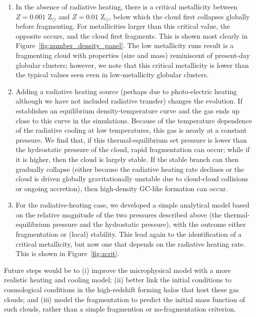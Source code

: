 \documentclass[useAMS,usenatbib]{mn2e}
\begin{document}
\begin{enumerate}

\item In the absence of radiative heating, there is a critical metallicity between $Z=0.001$ Z$_\odot$ and $Z=0.01$ Z$_\odot$, below which the cloud first collapses globally before fragmenting.  For metallicities larger than this critical value, the opposite occurs, and the cloud first fragments.  This is shown most clearly in Figure~\ref{fig:number_density_panel}.  The low metallicity runs result is a fragmenting cloud with properties (size and mass) reminiscent of present-day globular clusters; however, we note that this critical metallicity is lower than the typical values seen even in low-metallicity globular clusters.

\item Adding a radiative heating source (perhaps due to photo-electric heating although we have not included radiative transfer) changes the evolution.  If establishes an equilibrium density-temperature curve and the gas ends up close to this curve in the simulations.  Because of the temperature dependence of the radiative cooling at low temperatures, this gas is nearly at a constant pressure.  We find that, if this thermal-equilibrium set pressure is lower than the hydrostatic pressure of the cloud, rapid fragmentation can occur; while if it is higher, then the cloud is largely stable.  If the stable branch can then gradually collapse (either because the radiative heating rate declines or the cloud is driven globally gravitationally unstable due to cloud-cloud collisions or ongoing accretion), then high-density GC-like formation can occur.

\item For the radiative-heating case, we developed a simple analytical model based on the relative magnitude of the two pressures described above (the thermal-equilibrium pressure and the hydrostatic pressure), with the outcome either fragmentation or (local) stability.  This lead again to the identification of a critical metallicity, but now one that depends on the radiative heating rate.  This is shown in Figure~\ref{fig:zcrit}.

\end{enumerate}

Future steps would be to (i) improve the microphysical model with a more realistic heating and cooling model; (ii) better link the initial conditions to cosmological conditions in the high-redshift forming halos that host these gas clouds; and (iii) model the fragmentation to predict the initial mass function of such clouds, rather than a simple fragmention or no-fragmentation criterion.
\end{document}
